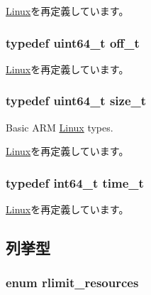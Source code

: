 \hyperlink{classLinux_a0001c50514d27f51d408e051dc803ad4}{Linux}を再定義しています。\hypertarget{classArmLinux64_a2cb84cf5f02a29b7e8f237ff151a9225}{
\subsubsection[{off\_\-t}]{\setlength{\rightskip}{0pt plus 5cm}typedef uint64\_\-t {\bf off\_\-t}}}
\label{classArmLinux64_a2cb84cf5f02a29b7e8f237ff151a9225}


\hyperlink{classLinux_a2cb84cf5f02a29b7e8f237ff151a9225}{Linux}を再定義しています。\hypertarget{classArmLinux64_a186ea1339bffb378854987065835afe3}{
\subsubsection[{size\_\-t}]{\setlength{\rightskip}{0pt plus 5cm}typedef uint64\_\-t {\bf size\_\-t}}}
\label{classArmLinux64_a186ea1339bffb378854987065835afe3}


Basic ARM \hyperlink{classLinux}{Linux} types. 

\hyperlink{classLinux_a186ea1339bffb378854987065835afe3}{Linux}を再定義しています。\hypertarget{classArmLinux64_a7f5991675a84025dc7c24754a9b257c0}{
\subsubsection[{time\_\-t}]{\setlength{\rightskip}{0pt plus 5cm}typedef int64\_\-t {\bf time\_\-t}}}
\label{classArmLinux64_a7f5991675a84025dc7c24754a9b257c0}


\hyperlink{classLinux_a7f5991675a84025dc7c24754a9b257c0}{Linux}を再定義しています。

\subsection{列挙型}
\hypertarget{classArmLinux64_a599454267926920de3bd5a488bda3e03}{
\subsubsection[{rlimit\_\-resources}]{\setlength{\rightskip}{0pt plus 5cm}enum {\bf rlimit\_\-resources}}}
\label{classArmLinux64_a599454267926920de3bd5a488bda3e03}



